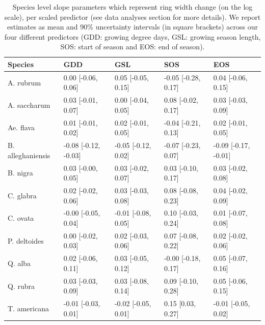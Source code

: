 \documentclass{article}\usepackage[]{graphicx}\usepackage[]{xcolor}
\begin{document}
\setcounter{table}{0}
\renewcommand{\thetable}{S\arabic{table}}
\setcounter{figure}{0}
\renewcommand{\thefigure}{S\arabic{figure}}


\begin{table}[ht]
\centering
\caption{Species level slope parameters which represent ring width change (on the log scale), per scaled predictor (see data analyses section for more details). We report estimates as mean and 90\% uncertainty intervals (in square brackets) across our four different predictors (GDD: growing degree days, GSL: growing season length, SOS: start of season and EOS: end of season).} 
\label{tab:ts_slope_table}
\begin{tabular}{lllll}
  \hline
Species & GDD & GSL & SOS & EOS \\ 
  \hline
A. rubrum & 0.00 [-0.06, 0.06] & 0.05 [-0.05, 0.15] & -0.05 [-0.28, 0.17] & 0.04 [-0.06, 0.15] \\ 
  A. saccharum & 0.03 [-0.01, 0.07] & 0.00 [-0.04, 0.05] & 0.08 [-0.02, 0.17] & 0.03 [-0.03, 0.09] \\ 
  Ae. flava & 0.01 [-0.01, 0.02] & 0.02 [-0.01, 0.05] & -0.04 [-0.21, 0.13] & 0.02 [-0.01, 0.05] \\ 
  B. alleghaniensis & -0.08 [-0.12, -0.03] & -0.05 [-0.12, 0.02] & -0.07 [-0.23, 0.07] & -0.09 [-0.17, -0.01] \\ 
  B. nigra & 0.03 [-0.00, 0.05] & 0.03 [-0.02, 0.07] & 0.03 [-0.10, 0.17] & 0.03 [-0.02, 0.08] \\ 
  C. glabra & 0.02 [-0.02, 0.06] & 0.03 [-0.03, 0.08] & 0.08 [-0.08, 0.23] & 0.04 [-0.02, 0.09] \\ 
  C. ovata & -0.00 [-0.05, 0.04] & -0.01 [-0.08, 0.05] & 0.10 [-0.03, 0.24] & 0.01 [-0.07, 0.08] \\ 
  P. deltoides & 0.00 [-0.02, 0.03] & 0.02 [-0.03, 0.06] & 0.07 [-0.08, 0.22] & 0.02 [-0.02, 0.06] \\ 
  Q. alba & 0.02 [-0.06, 0.11] & 0.03 [-0.05, 0.12] & -0.00 [-0.18, 0.17] & 0.05 [-0.07, 0.16] \\ 
  Q. rubra & 0.03 [-0.03, 0.09] & 0.03 [-0.08, 0.14] & 0.09 [-0.10, 0.28] & 0.05 [-0.06, 0.15] \\ 
  T. americana & -0.01 [-0.03, 0.01] & -0.02 [-0.05, 0.01] & 0.15 [0.03, 0.27] & -0.01 [-0.05, 0.02] \\ 
   \hline
\end{tabular}
\end{table}
\end{document}
